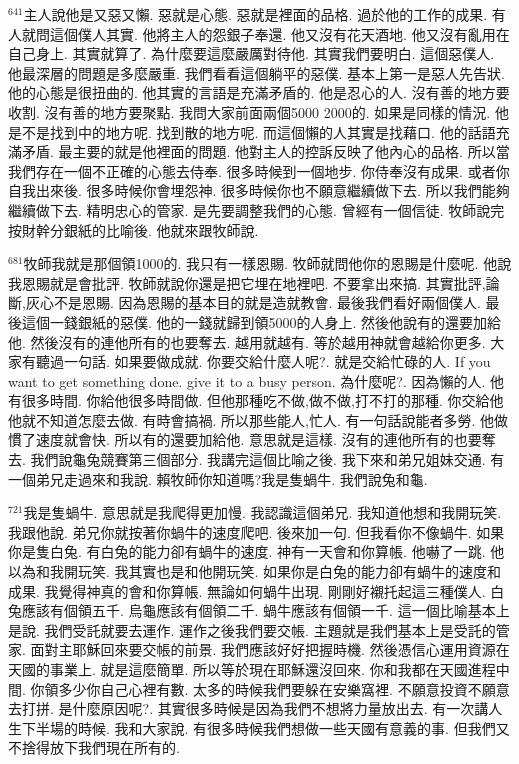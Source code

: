 \documentclass{book}
\begin{document}
$^{641}$主人說他是又惡又懶.
惡就是心態.
惡就是裡面的品格.
過於他的工作的成果.
有人就問這個僕人其實.
他將主人的怨銀子奉還.
他又沒有花天酒地.
他又沒有亂用在自己身上.
其實就算了.
為什麼要這麼嚴厲對待他.
其實我們要明白.
這個惡僕人.
他最深層的問題是多麼嚴重.
我們看看這個躺平的惡僕.
基本上第一是惡人先告狀.
他的心態是很扭曲的.
他其實的言語是充滿矛盾的.
他是忍心的人.
沒有善的地方要收割.
沒有善的地方要聚點.
我問大家前面兩個5000 2000的.
如果是同樣的情況.
他是不是找到中的地方呢.
找到散的地方呢.
而這個懶的人其實是找藉口.
他的話語充滿矛盾.
最主要的就是他裡面的問題.
他對主人的控訴反映了他內心的品格.
所以當我們存在一個不正確的心態去侍奉.
很多時候到一個地步.
你侍奉沒有成果.
或者你自我出來後.
很多時候你會埋怨神.
很多時候你也不願意繼續做下去.
所以我們能夠繼續做下去.
精明忠心的管家.
是先要調整我們的心態.
曾經有一個信徒.
牧師說完按財幹分銀紙的比喻後.
他就來跟牧師說.

$^{681}$牧師我就是那個領1000的.
我只有一樣恩賜.
牧師就問他你的恩賜是什麼呢.
他說我恩賜就是會批評.
牧師就說你還是把它埋在地裡吧.
不要拿出來搞.
其實批評,論斷,灰心不是恩賜.
因為恩賜的基本目的就是造就教會.
最後我們看好兩個僕人.
最後這個一錢銀紙的惡僕.
他的一錢就歸到領5000的人身上.
然後他說有的還要加給他.
然後沒有的連他所有的也要奪去.
越用就越有.
等於越用神就會越給你更多.
大家有聽過一句話.
如果要做成就.
你要交給什麼人呢?.
就是交給忙碌的人.
If you want to get something done.
give it to a busy person.
為什麼呢?.
因為懶的人.
他有很多時間.
你給他很多時間做.
但他那種吃不做,做不做,打不打的那種.
你交給他他就不知道怎麼去做.
有時會搞禍.
所以那些能人,忙人.
有一句話說能者多勞.
他做慣了速度就會快.
所以有的還要加給他.
意思就是這樣.
沒有的連他所有的也要奪去.
我們說龜兔競賽第三個部分.
我講完這個比喻之後.
我下來和弟兄姐妹交通.
有一個弟兄走過來和我說.
賴牧師你知道嗎?我是隻蝸牛.
我們說兔和龜.

$^{721}$我是隻蝸牛.
意思就是我爬得更加慢.
我認識這個弟兄.
我知道他想和我開玩笑.
我跟他說.
弟兄你就按著你蝸牛的速度爬吧.
後來加一句.
但我看你不像蝸牛.
如果你是隻白兔.
有白兔的能力卻有蝸牛的速度.
神有一天會和你算帳.
他嚇了一跳.
他以為和我開玩笑.
我其實也是和他開玩笑.
如果你是白兔的能力卻有蝸牛的速度和成果.
我覺得神真的會和你算帳.
無論如何蝸牛出現.
剛剛好襯托起這三種僕人.
白兔應該有個領五千.
烏龜應該有個領二千.
蝸牛應該有個領一千.
這一個比喻基本上是說.
我們受託就要去運作.
運作之後我們要交帳.
主題就是我們基本上是受託的管家.
面對主耶穌回來要交帳的前景.
我們應該好好把握時機.
然後憑信心運用資源在天國的事業上.
就是這麼簡單.
所以等於現在耶穌還沒回來.
你和我都在天國進程中間.
你領多少你自己心裡有數.
太多的時候我們要躲在安樂窩裡.
不願意投資不願意去打拼.
是什麼原因呢?.
其實很多時候是因為我們不想將力量放出去.
有一次講人生下半場的時候.
我和大家說.
有很多時候我們想做一些天國有意義的事.
但我們又不捨得放下我們現在所有的.
\end{document}
